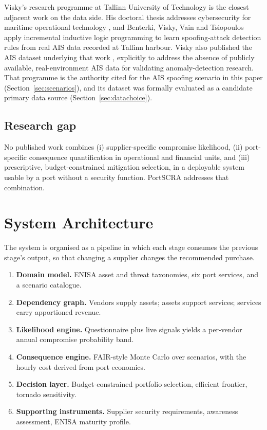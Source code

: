 \documentclass[conference]{IEEEtran}
\begin{document}
Visky's research programme at Tallinn University of Technology is the closest
adjacent work on the data side. His doctoral thesis addresses cybersecurity for
maritime operational technology \cite{viskythesis}, and Benterki, Visky, Vain and
Tsiopoulos \cite{benterki2025} apply incremental inductive logic programming to
learn spoofing-attack detection rules from real AIS data recorded at Tallinn
harbour. Visky also published the AIS dataset underlying that work
\cite{viskydataset}, explicitly to address the absence of publicly available,
real-environment AIS data for validating anomaly-detection research. That programme
is the authority cited for the AIS spoofing scenario in this paper
(Section~\ref{sec:scenarios}), and its dataset was formally evaluated as a
candidate primary data source (Section~\ref{sec:datachoice}).

\subsection{Research gap}

No published work combines (i) supplier-specific compromise likelihood, (ii)
port-specific consequence quantification in operational and financial units, and
(iii) prescriptive, budget-constrained mitigation selection, in a deployable system
usable by a port without a security function. PortSCRA addresses that combination.

\section{System Architecture}

The system is organised as a pipeline in which each stage consumes the previous
stage's output, so that changing a supplier changes the recommended purchase.

\begin{enumerate}
\item \textbf{Domain model.} ENISA asset and threat taxonomies, six port services,
and a scenario catalogue.
\item \textbf{Dependency graph.} Vendors supply assets; assets support services;
services carry apportioned revenue.
\item \textbf{Likelihood engine.} Questionnaire plus live signals yields a
per-vendor annual compromise probability band.
\item \textbf{Consequence engine.} FAIR-style Monte Carlo over scenarios, with the
hourly cost derived from port economics.
\item \textbf{Decision layer.} Budget-constrained portfolio selection, efficient
frontier, tornado sensitivity.
\item \textbf{Supporting instruments.} Supplier security requirements, awareness
assessment, ENISA maturity profile.
\end{enumerate}
\end{document}
